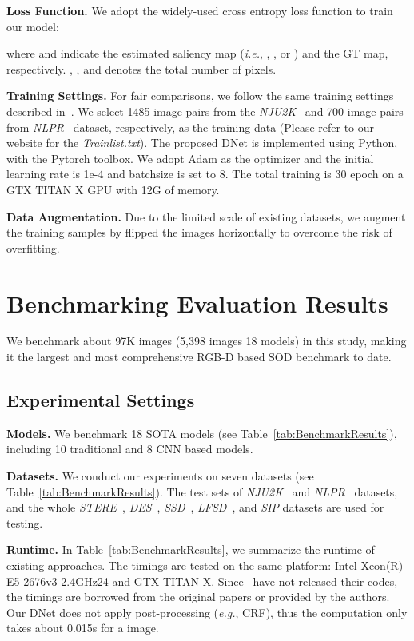 \documentclass[journal]{IEEEtran}
\def\ie{\emph{i.e.}}
\def\eg{\emph{e.g.}}
\newcommand{\tabref}[1]{Table~\ref{#1}}
\newcommand{\fdp}[1]{#1}
\begin{document}
\textbf{Loss Function.}
We adopt the widely-used cross entropy loss function  to train our model:

where  and 
\fdp{indicate} the estimated saliency map (\ie, , , or ) and the GT map, respectively. , , and  denotes the total number of pixels.

\textbf{Training Settings.}
For fair comparisons, we follow the same training settings described in~\cite{zhao2019Contrast}.
We select 1485 image pairs from the \textit{NJU2K}~\cite{ju2014depth} and 700 image pairs from \textit{NLPR}~\cite{peng2014rgbd} dataset, respectively,  as the training data (Please refer to our website for the \textit{Trainlist.txt}).
The proposed DNet is implemented using Python, with the Pytorch toolbox.
We adopt Adam as the optimizer and the initial learning rate is 1e-4 and batchsize is set to 8. The total training is 30 epoch on
\fdp{a} GTX TITAN X GPU with 12G \fdp{of} memory.





\textbf{Data Augmentation.}
Due to the limited scale of existing datasets,
we augment the training samples by flipped the images horizontally
to overcome the risk of overfitting.


\section{Benchmarking Evaluation Results}\label{sec:experiments}
We benchmark about 97K \fdp{images} (5,398 images  18 models)
in this study, making it the largest and most
comprehensive RGB-D based SOD benchmark to date.


\subsection{Experimental Settings}\label{sec:setting}
\textbf{Models.}
We benchmark 18 SOTA models (see \tabref{tab:BenchmarkResults}), including 10
traditional and 8 CNN based models.

\textbf{Datasets.}
We conduct our experiments on seven datasets (see \tabref{tab:BenchmarkResults}).
The test sets of \textit{NJU2K}~\cite{ju2014depth} and \textit{NLPR}~\cite{peng2014rgbd}
datasets, and the whole \textit{STERE}~\cite{niu2012leveraging}, \textit{DES}~\cite{cheng2014depth},
\textit{SSD}~\cite{zhu2017three}, \textit{LFSD}~\cite{li2014saliency},
and \textit{SIP} datasets are used for testing.

\textbf{Runtime.} In \tabref{tab:BenchmarkResults}, we summarize
the runtime of existing approaches.
The timings are tested on the same platform:
Intel Xeon(R) E5-2676v3 \@2.4GHz24 and GTX TITAN X.
Since~\cite{han2017cnns,chen2018attention,chen2019multi,chen2019three,
chen2018progressively,liang2018stereoscopic,cong2018hscs,cong2018co,cong2017iterative}
\fdp{have} not \fdp{released their codes}, the timings are borrowed from \fdp{the} original
paper\fdp{s} or provided by \fdp{the} authors.
Our DNet does not apply post-processing (\eg, CRF), thus the
computation only takes about 0.015s for a  image.
\end{document}
